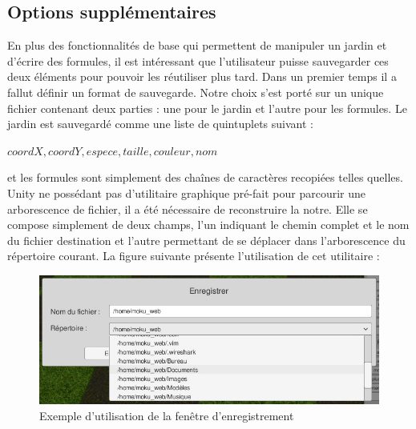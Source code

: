 \subsection{Options supplémentaires}

En plus des fonctionnalités de base qui permettent de manipuler un jardin et d'écrire des formules, il est intéressant que l'utilisateur puisse sauvegarder ces deux éléments pour pouvoir les réutiliser plus tard. Dans un premier temps il a fallut définir un format de sauvegarde. Notre choix s'est porté sur un unique fichier contenant deux parties : une pour le jardin et l'autre pour les formules. Le jardin est sauvegardé comme une liste de quintuplets suivant :
\begin{center}$ coordX, coordY, espece, taille, couleur, nom $ \end{center}
et les formules sont simplement des chaînes de caractères recopiées telles quelles. Unity ne possédant pas d'utilitaire graphique pré-fait pour parcourir une arborescence de fichier, il a été nécessaire de reconstruire la notre. Elle se compose simplement de deux champs, l'un indiquant le chemin complet et le nom du fichier destination et l'autre permettant de se déplacer dans l'arborescence du répertoire courant. La figure suivante présente l'utilisation de cet utilitaire :

\begin{center}
\begin{figure}[!h]
\includegraphics[scale=0.5]{choix_techniques/parcours_rep.jpg}
\caption{Exemple d'utilisation de la fenêtre d'enregistrement}
\end{figure}
\end{center}
\clearpage